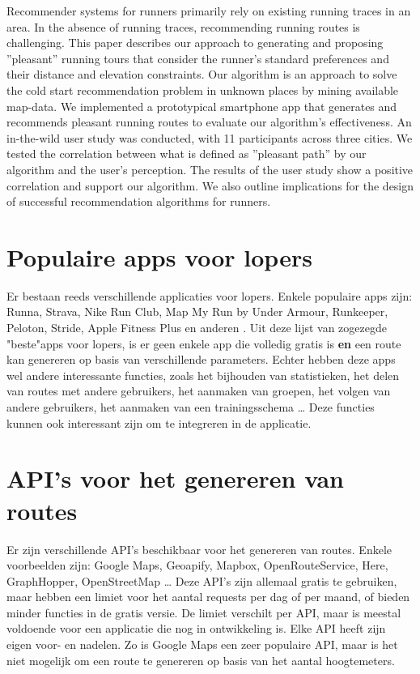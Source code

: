     Recommender systems for runners primarily rely on existing running traces in an area. 
    In the absence of running traces, recommending running routes is challenging. 
    This paper describes our approach to generating and proposing ”pleasant” running tours that consider the runner’s 
    standard preferences and their distance and elevation constraints. 
    Our algorithm is an approach to solve the cold start recommendation problem in unknown places by mining available map-data. 
    We implemented a prototypical smartphone app that generates and recommends pleasant running routes to evaluate our algorithm’s 
    effectiveness. An in-the-wild user study was conducted, with 11 participants across three cities. 
    We tested the correlation between what is defined as ”pleasant path” by our algorithm and the user’s perception. 
    The results of the user study show a positive correlation and support our algorithm. We also outline implications for the design 
    of successful recommendation algorithms for runners.
    

\section{Populaire apps voor lopers}

Er bestaan reeds verschillende applicaties voor lopers. Enkele populaire apps zijn:
Runna, Strava, Nike Run Club, Map My Run by Under Armour, Runkeeper, Peloton, Stride, Apple Fitness Plus en anderen \autocite{Downey2023}.
Uit deze lijst van zogezegde "beste"\@ apps voor lopers,
is er geen enkele app die volledig gratis is \textbf{en} een route kan genereren op basis van verschillende parameters.
Echter hebben deze apps wel andere interessante functies, zoals het bijhouden van statistieken, het delen van routes met andere gebruikers,
het aanmaken van groepen, het volgen van andere gebruikers, het aanmaken van een trainingsschema \ldots \@
Deze functies kunnen ook interessant zijn om te integreren in de applicatie.

\section{API's voor het genereren van routes}

Er zijn verschillende API's beschikbaar voor het genereren van routes.
Enkele voorbeelden zijn: Google Maps, Geoapify, Mapbox, OpenRouteService, Here, GraphHopper, OpenStreetMap \ldots \@
Deze API's zijn allemaal gratis te gebruiken, maar hebben een limiet voor het aantal requests per dag of per maand,
of bieden minder functies in de gratis versie. De limiet verschilt per API, maar is meestal voldoende voor een applicatie die nog in ontwikkeling is.
Elke API heeft zijn eigen voor- en nadelen. Zo is Google Maps een zeer populaire API,
maar is het niet mogelijk om een route te genereren op basis van het aantal hoogtemeters.

